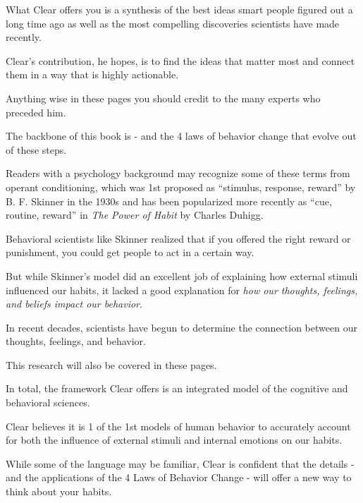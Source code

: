 \documentclass[oneside]{article}
\numberwithin{equation}{section}
\begin{document}
What Clear offers you is a synthesis of the best ideas smart people figured out a long time ago as well as the most compelling discoveries scientists have made recently.

Clear's contribution, he hopes, is to find the ideas that matter most and connect them in a way that is highly actionable.

Anything wise in these pages you should credit to the many experts who preceded him.


%
The backbone of this book is  - and the 4 laws of behavior change that evolve out of these steps.

Readers with a psychology background may recognize some of these terms from operant conditioning, which was 1st proposed as ``stimulus, response, reward'' by B. F. Skinner in the 1930s and has been popularized more recently as ``cue, routine, reward'' in \textit{The Power of Habit} by Charles Duhigg.

%
Behavioral scientists like Skinner realized that if you offered the right reward or punishment, you could get people to act in a certain way.

But while Skinner's model did an excellent job of explaining how external stimuli influenced our habits, it lacked a good explanation for \textit{how our thoughts, feelings, and beliefs impact our behavior}.


In recent decades, scientists have begun to determine the connection between our thoughts, feelings, and behavior.

This research will also be covered in these pages.

%
In total, the framework Clear offers is an integrated model of the cognitive and behavioral sciences.

Clear believes it is 1 of the 1st models of human behavior to accurately account for both the influence of external stimuli and internal emotions on our habits.

While some of the language may be familiar, Clear is confident that the details - and the applications of the 4 Laws of Behavior Change - will offer a new way to think about your habits.

%
\end{document}
